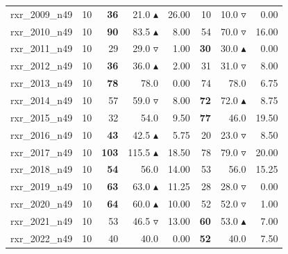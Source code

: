 \begin{table}[]
{\begin{tabular}{ll@{\hspace{1.2cm}}rrr@{\hspace{1.2cm}}rrr}
rxr_2009_n49 & 10 & \textbf{36} & 21.0 $\blacktriangle$ & 26.00 & 10 & 10.0 $\triangledown$ & 0.00 \\
rxr_2010_n49 & 10 & \textbf{90} & 83.5 $\blacktriangle$ & 8.00 & 54 & 70.0 $\triangledown$ & 16.00 \\
rxr_2011_n49 & 10 & 29 & 29.0 $\triangledown$ & 1.00 & \textbf{30} & 30.0 $\blacktriangle$ & 0.00 \\
rxr_2012_n49 & 10 & \textbf{36} & 36.0 $\blacktriangle$ & 2.00 & 31 & 31.0 $\triangledown$ & 8.00 \\
rxr_2013_n49 & 10 & \textbf{78} & 78.0 \phantom{$\blacktriangle$} & 0.00 & 74 & 78.0 \phantom{$\blacktriangle$} & 6.75 \\
rxr_2014_n49 & 10 & 57 & 59.0 $\triangledown$ & 8.00 & \textbf{72} & 72.0 $\blacktriangle$ & 8.75 \\
rxr_2015_n49 & 10 & 32 & 54.0 \phantom{$\blacktriangle$} & 9.50 & \textbf{77} & 46.0 \phantom{$\blacktriangle$} & 19.50 \\
rxr_2016_n49 & 10 & \textbf{43} & 42.5 $\blacktriangle$ & 5.75 & 20 & 23.0 $\triangledown$ & 8.50 \\
rxr_2017_n49 & 10 & \textbf{103} & 115.5 $\blacktriangle$ & 18.50 & 78 & 79.0 $\triangledown$ & 20.00 \\
rxr_2018_n49 & 10 & \textbf{54} & 56.0 \phantom{$\blacktriangle$} & 14.00 & 53 & 56.0 \phantom{$\blacktriangle$} & 15.25 \\
rxr_2019_n49 & 10 & \textbf{63} & 63.0 $\blacktriangle$ & 11.25 & 28 & 28.0 $\triangledown$ & 0.00 \\
rxr_2020_n49 & 10 & \textbf{64} & 60.0 $\blacktriangle$ & 10.00 & 52 & 52.0 $\triangledown$ & 1.00 \\
rxr_2021_n49 & 10 & 53 & 46.5 $\triangledown$ & 13.00 & \textbf{60} & 53.0 $\blacktriangle$ & 7.00 \\
rxr_2022_n49 & 10 & 40 & 40.0 \phantom{$\blacktriangle$} & 0.00 & \textbf{52} & 40.0 \phantom{$\blacktriangle$} & 7.50 \\
\bottomrule
    \end{tabular}
    }
\end{table}
